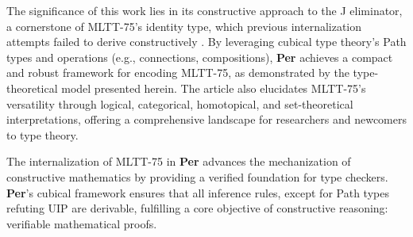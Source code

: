 \documentclass{article}
\begin{document}
The significance of this work lies in its constructive approach to the
J eliminator, a cornerstone of MLTT-75’s identity type, which previous
internalization attempts failed to derive constructively \cite{Lof75, Nordstrom90}.
By leveraging cubical type theory’s Path types and operations (e.g., connections,
compositions), \textbf{Per} achieves a compact and robust framework for encoding
MLTT-75, as demonstrated by the type-theoretical model presented herein.
The article also elucidates MLTT-75’s versatility through logical, categorical,
homotopical, and set-theoretical interpretations, offering a comprehensive
landscape for researchers and newcomers to type theory.

The internalization of MLTT-75 in \textbf{Per} advances the mechanization
of constructive mathematics by providing a verified foundation for type checkers.
\textbf{Per}’s cubical framework ensures that all inference rules,
except for Path types refuting UIP are derivable, fulfilling a core objective
of constructive reasoning: verifiable mathematical proofs.
\end{document}

